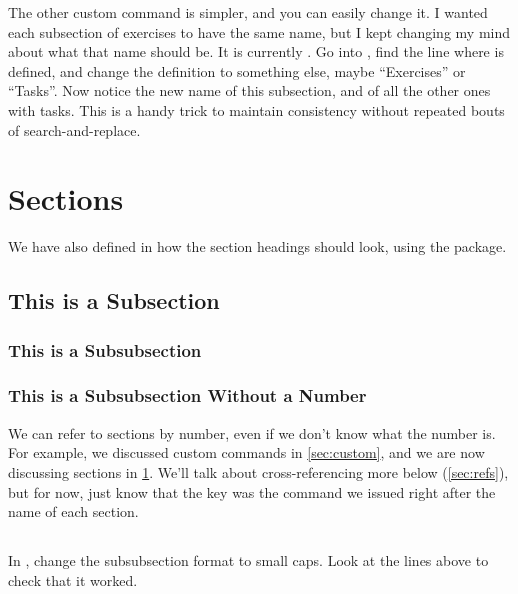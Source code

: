 \documentclass{article}
\begin{document}
The other custom command is simpler, and you can easily change it.
I wanted each subsection of exercises to have the same name, but I kept changing my mind about what that name should be.
It is currently \task.
Go into , find the line where \latexcode{\\task} is defined, and change the definition to something else, maybe ``Exercises'' or ``Tasks''.
Now notice the new name of this subsection, and of all the other ones with tasks.
This is a handy trick to maintain consistency without repeated bouts of search-and-replace.

\section{Sections}
\label{sec:sections}

We have also defined in  how the section headings should look, using the  package.

\subsection{This is a Subsection}

\subsubsection{This is a Subsubsection}

\subsubsection*{This is a Subsubsection Without a Number}

We can refer to sections by number, even if we don't know what the number is.
For example, we discussed custom commands in \cref{sec:custom}, and we are now discussing sections in \cref{sec:sections}.
We'll talk about cross-referencing more below (\cref{sec:refs}), but for now, just know that the key was the \latexcode{\\label} command we issued right after the name of each section.

\subsection*{\task}

In , change the subsubsection format to small caps.
Look at the lines above to check that it worked.
\end{document}
